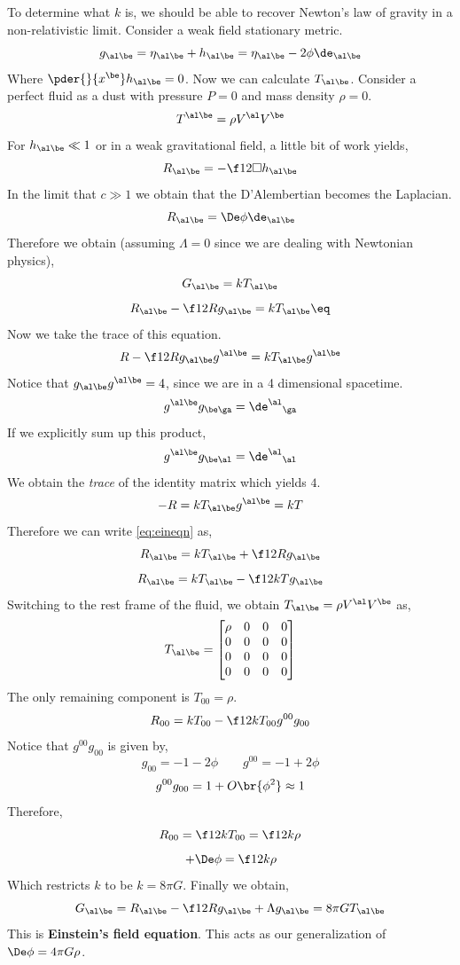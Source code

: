 \documentclass{article}
\newcommand{\mtrx}[1]{
    \begin{bmatrix}
    #1
    \end{bmatrix}
}
\begin{document}
To determine what $k$ is, we should be able to recover Newton's law of gravity in a non-relativistic limit. Consider a weak field stationary metric.
\[ g_{\al\be} = \eta_{\al\be} + h_{\al\be} = \eta_{\al\be} -2 \phi\de_{\al\be}\]
Where $\pder{}{x^\be} h_{\al\be} = 0$. Now we can calculate $T_{\al\be}$. Consider a perfect fluid as a dust with pressure $P= 0$ and mass density $\rho=0$.
\[ T^{\al\be} = \rho V^\al V^\be \]
For $h_{\al\be} \ll 1$ or in a weak gravitational field, a little bit of work yields,
\[ R_{\al\be} = -\f12 \Box h_{\al\be} \]
In the limit that $c \gg 1$ we obtain that the D'Alembertian becomes the Laplacian.
\[ R_{\al\be} = \De \phi \de_{\al\be} \]
Therefore we obtain (assuming $\Lambda = 0$ since we are dealing with Newtonian physics),
\[ G_{\al\be} = k T_{\al\be} \]
\[ R_{\al\be} - \f12 R g_{\al\be} = k T_{\al\be} \eq \label{eq:eineqn}\]
Now we take the trace of this equation.
\[ R - \f12 R g_{\al\be} g^{\al\be} = k T_{\al\be}g^{\al\be} \]
Notice that $g_{\al\be} g^{\al\be} = 4$, since we are in a 4 dimensional spacetime.
\[ g^{\al\be} g_{\be\ga} = {\de^\al}_{\ga} \]
If we explicitly sum up this product,
\[ g^{\al\be} g_{\be\al} = {\de^\al}_{\al} \]
We obtain the \textit{trace} of the identity matrix which yields $4$.
\[ -R = k T_{\al\be}g^{\al\be} = kT \]
Therefore we can write \eqref{eq:eineqn} as,
\[ R_{\al\be} = k T_{\al\be} + \f12 R g_{\al\be} \]
\[ R_{\al\be} = k T_{\al\be} - \f12 k T g_{\al\be} \]
Switching to the rest frame of the fluid, we obtain $T_{\al\be} = \rho V^\al V^\be$ as,
\[ T_{\al\be} = \mtrx{\rho & 0 & 0 & 0 \\0 & 0 & 0 & 0 \\0 & 0 & 0 & 0 \\0 & 0 & 0 & 0} \]
The only remaining component is $T_{00} = \rho$.
\[ R_{00} = k T_{00} - \f12 k T_{00} g^{00} g_{00}\]
Notice that $g^{00}g_{00}$ is given by,
\[ g_{00} = -1 - 2 \phi \qquad g^{00} = -1 + 2 \phi \]
\[ g^{00}g_{00} = 1 + O\br{\phi^2} \approx 1 \]
Therefore,
\[ R_{00} = \f12 k T_{00} = \f12 k \rho \]
\[ +\De \phi = \f12 k \rho \]
Which restricts $k$ to be $k = 8 \pi G$. Finally we obtain,
\[ G_{\al\be} = R_{\al\be} - \f12 R g_{\al\be} + \Lambda g_{\al\be} = 8 \pi G T_{\al\be} \]
This is \textbf{Einstein's field equation}. This acts as our generalization of $\De \phi = 4 \pi G \rho$.
\end{document}
